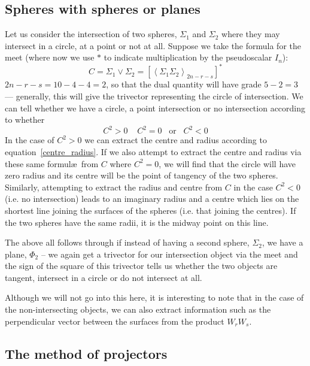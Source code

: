 \subsection{Spheres with spheres or planes}

Let us consider the intersection of two spheres, $\Sigma_1$ and
$\Sigma_2$ where they may intersect in a circle, at a point or not
at all. Suppose we take the formula for the meet (where now we use
$*$ to indicate multiplication by the pseudoscalar $I_n$):
%
\begin{equation}
C = \Sigma_1 \vee \Sigma_2 = \left[\left< \Sigma_1 \Sigma_2
\right>_{2n-r-s}\right]^*
\end{equation}
%
$2n-r-s = 10-4-4=2$, so that the dual quantity will have
grade $5-2=3$ --- generally, this will give the trivector
representing the circle of intersection. We can tell
whether we have a circle, a point intersection or no
intersection according to whether
%
\begin{equation}
C^2 >0 \;\;\;\; C^2 = 0 \;\;\;\mbox{or}\;\;\; C^2<0
\end{equation}
%
In the case of $C^2>0$ we can extract the centre and radius
according to equation~\ref{centre_radius}. If we also attempt to
extract the centre and radius via these same formul\ae\ from $C$
where $C^2=0$, we will find that the circle will have zero radius
and its centre will be the point of tangency of the two spheres.
Similarly, attempting to extract the radius and centre from $C$ in
the case $C^2<0$ (i.e. no intersection) leads to an imaginary
radius and a centre which lies on the shortest line joining the
surfaces of the spheres (i.e. that joining the centres). If the
two spheres have the same radii, it is the midway point on this
line.

The above all follows through if instead of having a
second sphere, $\Sigma_2$, we have a plane, $\Phi_2$ --
we again get a trivector for our intersection object via the meet and the sign
of the square of this trivector tells us whether the two objects are tangent,
intersect in a circle or do not intersect at all.

Although we will not go into this here, it is interesting
to note that in the case of the non-intersecting objects,
we can also extract information such as the perpendicular
vector between the surfaces from the product $W_rW_s$.


\subsection{The method of projectors}
\label{sec:projectors}

